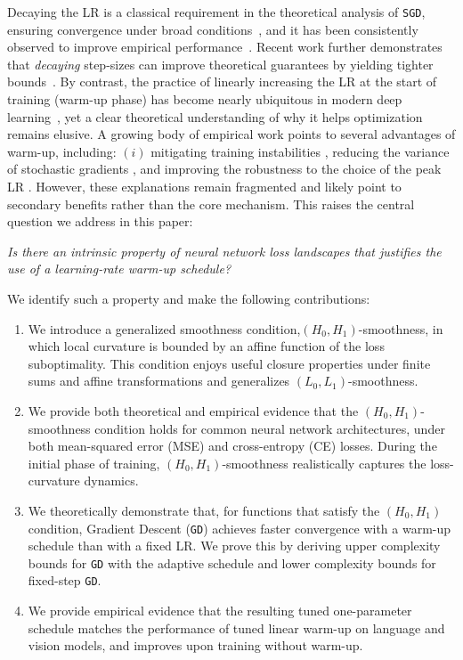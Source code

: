 \documentclass[a4paper,11pt]{article}
\newcommand{\algname}[1]{\texttt{#1}}
\newcommand{\1}{\mathbbm{1}}
\theoremstyle{plain}
\begin{document}
Decaying the LR is a classical requirement in the theoretical analysis of \algname{SGD}, ensuring convergence under broad conditions~\citep{defazio2023optimal, gower2021sgd}, and it has been consistently observed to improve empirical performance~\citep{loshchilov2016sgdr, hu2024minicpm, hagele2024scaling}. Recent work further demonstrates that \emph{decaying} step-sizes can improve theoretical guarantees by yielding tighter bounds~\citep{schaipp2025surprising}. By contrast, the practice of linearly increasing the LR at the start of training (warm-up phase) has become nearly ubiquitous in modern deep learning~\citep{he2016deep, hu2024minicpm, hagele2024scaling}, yet a clear theoretical understanding of why it helps optimization remains elusive. A growing body of empirical work points to several advantages of warm-up, including: $(i)$ mitigating training instabilities \citep{kosson2024analyzing, goyal2017accurate, zhang2023dive}, reducing the variance of stochastic gradients \citep{liu2019variance}, and improving the robustness to the choice of the peak LR \citep{wortsman2023small, kalra2024warmup}. 
However, these explanations remain fragmented and likely point to secondary benefits rather than the core mechanism. This raises the central question we address in this paper:

\textit{
Is there an intrinsic property of neural network loss landscapes that justifies the use of a learning-rate warm-up schedule?
}


We identify such a property and make the following contributions:


\begin{enumerate}
    
    \item We introduce a generalized smoothness condition,$(H_0, H_1)$-smoothness, in which local curvature is bounded by an affine function of the loss suboptimality. This condition enjoys useful closure properties under finite sums and affine transformations and generalizes $(L_0, L_1)$-smoothness.

    \item We provide both theoretical and empirical evidence that the $(H_0, H_1)$-smoothness condition holds for common neural network architectures, under both mean-squared error (MSE) and cross-entropy (CE) losses. During the initial phase of training, $(H_0, H_1)$-smoothness realistically captures the loss-curvature dynamics.

    \item We theoretically demonstrate that, for functions that satisfy the $(H_0, H_1)$ condition, Gradient Descent (\algname{GD}) achieves faster convergence with a warm-up schedule than with a fixed LR. We prove this by deriving upper complexity bounds for \algname{GD} with the adaptive schedule and lower complexity bounds for fixed-step \algname{GD}.

    \item  We provide empirical evidence that the resulting tuned one-parameter schedule matches the performance of tuned linear warm-up on language and vision models, and improves upon training without warm-up.
\end{enumerate}
\end{document}
